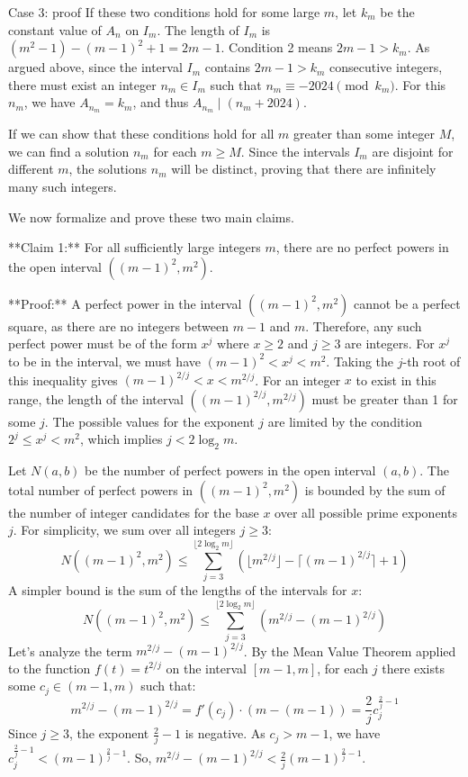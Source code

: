 \documentclass{article} %
\begin{document}
\begin{promptbox}{Case 3: proof}
If these two conditions hold for some large $m$, let $k_m$ be the constant value of $A_n$ on $I_m$. The length of $I_m$ is $(m^2-1) - (m-1)^2 + 1 = 2m-1$. Condition 2 means $2m-1 > k_m$. As argued above, since the interval $I_m$ contains $2m-1 > k_m$ consecutive integers, there must exist an integer $n_m \in I_m$ such that $n_m \equiv -2024 \pmod{k_m}$. For this $n_m$, we have $A_{n_m}=k_m$, and thus $A_{n_m} \mid (n_m+2024)$.

If we can show that these conditions hold for all $m$ greater than some integer $M$, we can find a solution $n_m$ for each $m \ge M$. Since the intervals $I_m$ are disjoint for different $m$, the solutions $n_m$ will be distinct, proving that there are infinitely many such integers.

We now formalize and prove these two main claims.

**Claim 1:** For all sufficiently large integers $m$, there are no perfect powers in the open interval $((m-1)^2, m^2)$.

**Proof:**
A perfect power in the interval $((m-1)^2, m^2)$ cannot be a perfect square, as there are no integers between $m-1$ and $m$. Therefore, any such perfect power must be of the form $x^j$ where $x \ge 2$ and $j \ge 3$ are integers.
For $x^j$ to be in the interval, we must have $(m-1)^2 < x^j < m^2$.
Taking the $j$-th root of this inequality gives $(m-1)^{2/j} < x < m^{2/j}$.
For an integer $x$ to exist in this range, the length of the interval $((m-1)^{2/j}, m^{2/j})$ must be greater than 1 for some $j$.
The possible values for the exponent $j$ are limited by the condition $2^j \le x^j < m^2$, which implies $j < 2\log_2 m$.

Let $N(a, b)$ be the number of perfect powers in the open interval $(a, b)$. The total number of perfect powers in $((m-1)^2, m^2)$ is bounded by the sum of the number of integer candidates for the base $x$ over all possible prime exponents $j$. For simplicity, we sum over all integers $j \ge 3$:
$$N((m-1)^2, m^2) \le \sum_{j=3}^{\lfloor 2\log_2 m \rfloor} \left( \lfloor m^{2/j} \rfloor - \lceil (m-1)^{2/j} \rceil + 1 \right)$$
A simpler bound is the sum of the lengths of the intervals for $x$:
$$N((m-1)^2, m^2) \le \sum_{j=3}^{\lfloor 2\log_2 m \rfloor} \left( m^{2/j} - (m-1)^{2/j} \right)$$
Let's analyze the term $m^{2/j} - (m-1)^{2/j}$. By the Mean Value Theorem applied to the function $f(t) = t^{2/j}$ on the interval $[m-1, m]$, for each $j$ there exists some $c_j \in (m-1, m)$ such that:
$$m^{2/j} - (m-1)^{2/j} = f'(c_j) \cdot (m - (m-1)) = \frac{2}{j}c_j^{\frac{2}{j}-1}$$
Since $j \ge 3$, the exponent $\frac{2}{j}-1$ is negative. As $c_j > m-1$, we have $c_j^{\frac{2}{j}-1} < (m-1)^{\frac{2}{j}-1}$.
So, $m^{2/j} - (m-1)^{2/j} < \frac{2}{j}(m-1)^{\frac{2}{j}-1}$.


\end{promptbox}
\end{document}
